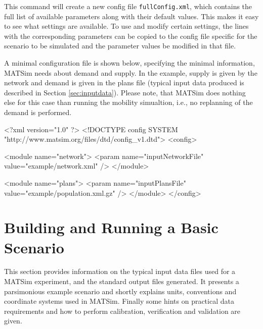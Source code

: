 This command will create a new config file \lstinline|fullConfig.xml|, which contains the full list of available parameters along with their default values. This makes it easy to see what settings are available. To use and modify certain settings, the lines with the corresponding parameters can be copied to the config file specific for the scenario to be simulated and the parameter values be modified in that file. 

A minimal configuration file is shown below, specifying the minimal information, MATSim needs about demand and supply. In the example, supply is given by the network and demand is given in the plans file (typical input data produced is described in Section \ref{sec:inputdata}). Please note, that MATSim does nothing else for this case than running the mobility simualtion, i.e., no replanning of the demand is performed.

\begin{xml}
<?xml version="1.0" ?> 
<!DOCTYPE config SYSTEM "http://www.matsim.org/files/dtd/config_v1.dtd"> 
<config> 
 
   <module name="network"> 
      <param name="inputNetworkFile" value="example/network.xml" /> 
   </module> 
 
   <module name="plans"> 
      <param name="inputPlansFile" value="example/population.xml.gz" /> 
   </module> 
</config>
\end{xml}

\section{Building and Running a Basic Scenario}
\label{sec:buildingbasicscenario}
This section provides information on the typical input data files used for a MATSim experiment, and the standard output files generated. It presents a parsimonious example scenario and shortly explains units, conventions and coordinate systems used in MATSim. Finally some hints on practical data requirements and how to perform calibration, verification and validation are given.


